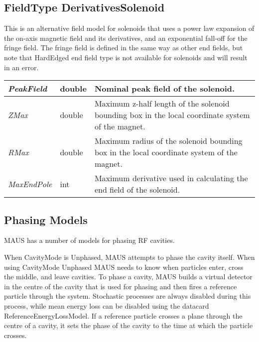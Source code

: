 \subsection{FieldType DerivativesSolenoid}
This is an alternative field model for solenoids that uses a power law expansion of the on-axis magnetic field and its
derivatives, and an exponential fall-off for the fringe field. The fringe field is defined in the same way as other end
fields, but note that HardEdged end field type is not available for solenoids and will result in an error.

\begin{center}
\tabletail{}
\tablelasttail{}
\begin{supertabular}{|m{3.665cm}|m{1.278cm}|m{10cm}|}
\hline
{\itshape PeakField} &
double &
Nominal peak field of the solenoid.\\\hline
{\itshape ZMax} &
double &
Maximum z-half length of the solenoid bounding box in the local coordinate system of the magnet.\\\hline
{\itshape RMax} &
double &
Maximum radius of the solenoid bounding box in the local coordinate system of the magnet.\\\hline
{\itshape MaxEndPole} &
int &
Maximum derivative used in calculating the end field of the solenoid.\\\hline
\end{supertabular}
\end{center}
\subsection{Phasing Models}
MAUS has a number of models for phasing RF cavities.

When CavityMode is Unphased, MAUS attempts to phase the cavity itself. When using CavityMode Unphased MAUS needs to
know when particles enter, cross the middle, and leave cavities. To phase a cavity, MAUS builds a virtual detector in the
centre of the cavity that is used for phasing and then fires a reference particle through the system. Stochastic
processes are always disabled during this process, while mean energy
loss can be disabled using the datacard ReferenceEnergyLossModel. If a reference particle crosses a plane through the
centre of a cavity, it sets the phase of the cavity to the time at which the particle crosses. 

